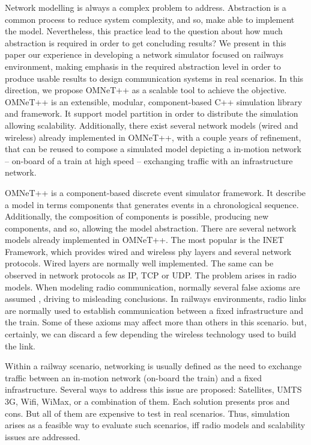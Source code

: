 \documentclass[times, 10pt,twocolumn]{article}
\begin{document}
Network modelling is always a complex problem to address. Abstraction is a
common process to reduce system complexity, and so, make able to implement 
the model. Nevertheless, this practice lead to the question about how
much abstraction is required in order to get concluding results? We present in this
paper our experience in developing a network simulator focused on railways
environment, making emphasis in the required abstraction level in order to
produce usable results to design communication systems in real scenarios. In this 
direction, we propose OMNeT++ as a scalable tool to achieve the objective. OMNeT++ is an 
extensible, modular, component-based C++ simulation library and framework. It support 
model partition in order to distribute the simulation allowing scalability. Additionally, 
there exist several network models (wired and wireless) already implemented in
OMNeT++, with a couple years of refinement, that can be reused to compose a 
simulated model depicting a in-motion network -- on-board of a train at high
speed -- exchanging traffic with an infrastructure network.


OMNeT++\cite{VaHo08} is a component-based discrete event simulator framework.
It describe a model in terms components that generates events in a chronological sequence. 
Additionally, the composition of components is possible, producing new components, and so,
allowing the model abstraction. There are several network models
already implemented in OMNeT++. The most popular is the INET Framework, which
provides wired and wireless phy layers and several network protocols. Wired
layers are normally well implemented. The same can be observed in
network protocols as IP, TCP or UDP. The problem arises in radio models. 
When modeling radio communication, normally several false axioms are assumed \cite{Kotz04}, 
driving to misleading conclusions. In railways environments, radio
links are normally used to establish communication between a fixed infrastructure and 
the train. Some of these axioms may affect more than others in this scenario.
but, certainly, we can discard a few depending the wireless technology used to
build the link.


Within a railway scenario, networking is usually defined as the need to exchange
traffic between an in-motion network (on-board the train) and a fixed
infrastructure. Several ways to address this issue are proposed:
Satellites, UMTS 3G, Wifi, WiMax, or a combination of them. Each solution
presents pros and cons. But all of them are expensive to test in real
scenarios. Thus, simulation arises as a feasible way to evaluate such
scenarios, iff radio models and scalability issues are addressed. 
\end{document}
